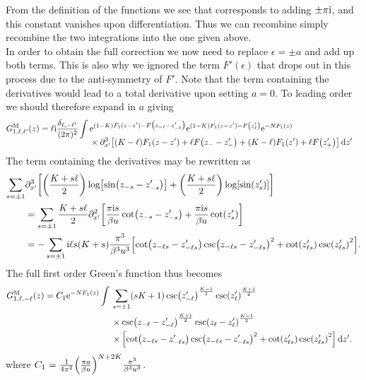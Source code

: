 \documentclass[english, parskip=full]{scrartcl}
\begin{document}
From the definition of the functions we see that corresponds to adding $\pm\pi\text{i}$, and this constant vanishes upon differentiation.
Thus we can recombine simply recombine the two integrations into the one given above.\\
In order to obtain the full correction we now need to replace $\epsilon=\pm a$ and add up both terms.
This is also why we ignored the term $F'(\epsilon)$ that drops out in this process due to the anti-symmetry of $F'$.
Note that the term containing the derivatives would lead to a total derivative upon setting $a=0$.
To leading order we should therefore expand in $a$ giving
\begin{align}
G_{1,\ell,\ell'}^\M(z) &= \ell\i \frac{\delta_{\ell,-\ell'}}{(2\pi)^2} \int \bsplit{&\powe{(1-K) F_1(z-z') -F\kla[\big]{z_{-\ell} - z_{-\ell}'}} \powe{(1-K) F_1(z-z')-F\kla*{z_{\ell}'}} \powe{-NF_1(z)}\\
&\times \partial_{x'}^3 \klb*{\kla*{ K-\ell}F_1(z-z')+\ell F\kla*{z_{-} - z_{-}'}+\kla*{ K -\ell}F_1(z')+\ell F\kla*{z_{+}'}}\,\d z'}
\end{align}
The term containing the derivatives may be rewritten as
\begin{align}
\sum_{s=\pm 1} &\partial_{x'}^3 \klb*{ \kla*{\frac{K+s\ell}{2}} \log\klb*{\sin\kla*{z_{-s} - z_{-s}'}} + \kla*{\frac{K+s\ell}{2}} \log\klb*{\sin\kla*{z_s'}}}\\
&=\sum_{s=\pm 1} \frac{K+s\ell}{2} \partial_{x'}^2 \klb*{ \frac{\pi \i s}{\beta u} \cot\kla*{z_{-s} - z_{-s}'} + \frac{\pi \i s}{\beta u} \cot\kla*{z_s'}}\\
&= -\sum_{s=\pm 1} \i \ell s \kla*{K+s} \frac{\pi^3}{\beta^3 u^3} \klb*{ \cot\kla*{z_{-\ell s} - z_{-\ell s}'} \csc\kla*{z_{-\ell s} - z_{-\ell s}'}^2 + \cot\kla*{z_{\ell s}'} \csc\kla*{z_{\ell s}'}^2}.
\end{align}
The full first order Green's function thus becomes
\begin{align}
G_{1,\ell,-\ell}^\M(z) &= C_1\powe{-NF_1(z)} \int \bsplit{& \sum_{s=\pm 1} \kla*{sK+1} \csc\kla*{z_{-\ell}'}^{\frac{K-1}{2}} \csc\kla*{z_{\ell}'}^{\frac{K+1}{2}}\\
&\times \csc\kla*{z_{-\ell} - z_{-\ell}'}^{\frac{K+1}{2}} \csc\kla*{z_{\ell} - z_{\ell}'}^{\frac{K-1}{2}} \\
&\times \klb[\Big]{ \cot\kla*{z_{-\ell s} - z_{-\ell s}'} \csc\kla*{z_{-\ell s} - z_{-\ell s}'}^2 + \cot\kla*{z_{\ell s}'} \csc\kla*{z_{\ell s}'}^2}\,\d z'.}
\end{align}
where $C_1 = \frac{1}{4\pi^2} \kla*{\frac{\pi a}{\beta u}}^{N+2K} \frac{\pi^3}{\beta^3 u^3}$.
\end{document}
